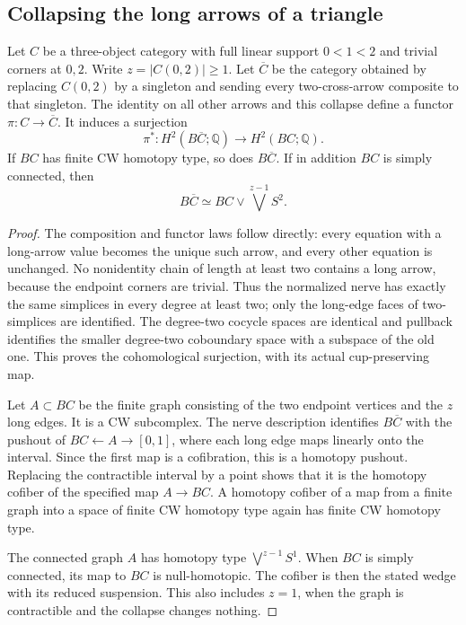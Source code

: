 \subsection{Collapsing the long arrows of a triangle}

\begin{lemma}
\label{CP2:A-triangle-long-collapse}
Let $C$ be a three-object category with full linear support
$0<1<2$ and trivial corners at $0,2$. Write
$z=|C(0,2)|\ge1$. Let $\overline C$ be the category obtained
by replacing $C(0,2)$ by a singleton and sending every
two-cross-arrow composite to that singleton. The identity
on all other arrows and this collapse define a functor
$\pi:C\to\overline C$. It induces a surjection
\[
 \pi^*:H^2(B\overline C;\mathbb Q)\longrightarrow H^2(BC;\mathbb Q).
\]
If $BC$ has finite CW homotopy type, so does $B\overline C$.
If in addition $BC$ is simply connected, then
\[
 B\overline C\simeq BC\vee\bigvee^{z-1}S^2.
\]
\end{lemma}
\begin{proof}
The composition and functor laws follow directly: every equation
with a long-arrow value becomes the unique such arrow, and
every other equation is unchanged. No nonidentity chain of
length at least two contains a long arrow, because the endpoint
corners are trivial. Thus the normalized nerve has exactly the
same simplices in every degree at least two; only the long-edge
faces of two-simplices are identified. The degree-two cocycle
spaces are identical and pullback identifies the smaller
degree-two coboundary space with a subspace of the old one.
This proves the cohomological surjection, with its actual
cup-preserving map.

Let $A\subset BC$ be the finite graph consisting of the two
endpoint vertices and the $z$ long edges. It is a CW subcomplex.
The nerve description identifies $B\overline C$ with the
pushout of $BC\leftarrow A\to[0,1]$, where each long edge
maps linearly onto the interval. Since the first map is a
cofibration, this is a homotopy pushout. Replacing the
contractible interval by a point shows that it is the homotopy
cofiber of the specified map $A\to BC$. A homotopy cofiber
of a map from a finite graph into a space of finite CW
homotopy type again has finite CW homotopy type.

The connected graph $A$ has homotopy type
$\bigvee^{z-1}S^1$. When $BC$ is simply connected, its map
to $BC$ is null-homotopic. The cofiber is then the stated
wedge with its reduced suspension. This also includes $z=1$,
when the graph is contractible and the collapse changes nothing.
\end{proof}

